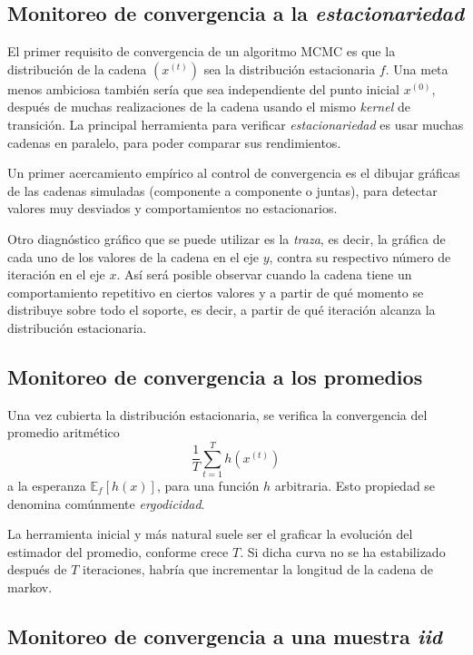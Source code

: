 \subsection{Monitoreo de convergencia a la \textit{estacionariedad}}

El primer requisito de convergencia de un algoritmo MCMC es que la distribución de la cadena $(x^{(t)})$ sea la distribución estacionaria $f$. Una meta menos ambiciosa también sería que sea independiente del punto inicial $x^{(0)}$, después de muchas realizaciones de la cadena  usando el mismo \textit{kernel} de transición. La principal herramienta para verificar \textit{estacionariedad} es usar muchas cadenas en paralelo, para poder comparar sus rendimientos. 

Un primer acercamiento empírico al control de convergencia es el dibujar gráficas de las cadenas simuladas (componente a componente o juntas), para detectar valores muy desviados y comportamientos no estacionarios. 

Otro diagnóstico gráfico que se puede utilizar es la \textit{traza}, es decir, la gr\'afica de cada uno de los valores de la cadena en el eje $y$, contra su respectivo n\'umero de iteraci\'on en el eje $x$. As\'i ser\'a posible observar cuando la cadena tiene un comportamiento repetitivo en ciertos valores y a partir de qu\'e momento se distribuye sobre todo el soporte, es decir, a partir de qu\'e iteraci\'on alcanza la distribuci\'on estacionaria. 

\subsection{Monitoreo de convergencia a los promedios}

Una vez cubierta la distribución estacionaria, se verifica la convergencia del promedio aritmético
\begin{equation*}
    \frac{1}{T}\sum_{t=1}^T h(x^{(t)})
\end{equation*}
a la esperanza $\mathbb{E}_f[h(x)]$, para una función $h$ arbitraria. Esto propiedad se denomina com\'unmente \textit{ergodicidad}.

La herramienta inicial y más natural suele ser el graficar la evolución del estimador del promedio, conforme crece $T$. Si dicha curva no se ha estabilizado después de $T$ iteraciones, habría que incrementar la longitud de la cadena de markov.

\subsection{Monitoreo de convergencia a una muestra \textit{iid}}

